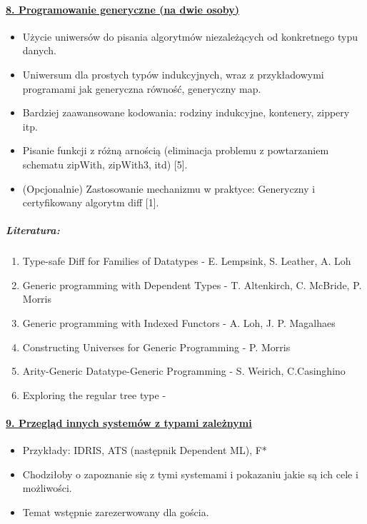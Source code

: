 \documentclass[10pt, a4paper]{article}
\begin{document}
\paragraph{\underline{8. Programowanie generyczne (na dwie osoby)}}


\begin{itemize}
\addtolength{\itemsep}{-0.5\baselineskip}

\item Użycie uniwersów do pisania algorytmów niezależących od konkretnego typu danych.
\item Uniwersum dla prostych typów indukcyjnych, wraz z przykładowymi programami jak generyczna równość, generyczny map.
\item Bardziej zaawansowane kodowania: rodziny indukcyjne, kontenery, zippery itp.
\item Pisanie funkcji z różną arnością (eliminacja problemu z powtarzaniem schematu zipWith, zipWith3, itd) [5].
\item (Opcjonalnie) Zastosowanie mechanizmu w praktyce: Generyczny i certyfikowany algorytm diff [1].

\end{itemize}

\subparagraph{Literatura:}


\begin{enumerate}
\addtolength{\itemsep}{-0.5\baselineskip}

\item  Type-safe Diff for Families of Datatypes - E. Lempsink, S. Leather, A. Loh
\item  Generic programming with Dependent Types - T. Altenkirch, C. McBride, P. Morris
\item  Generic programming with Indexed Functors - A. Loh, J. P. Magalhaes
\item  Constructing Universes for Generic Programming - P. Morris
\item  Arity-Generic Datatype-Generic Programming - S. Weirich, C.Casinghino
\item  Exploring the regular tree type -

\end{enumerate}

\paragraph{\underline{9. Przegląd innych systemów z typami zależnymi}}

\begin{itemize}
\addtolength{\itemsep}{-0.5\baselineskip}
 \item Przykłady: IDRIS, ATS (następnik Dependent ML), F*
 \item Chodziłoby o zapoznanie się z tymi systemami i pokazaniu jakie są ich cele i możliwości.
 \item Temat wstępnie zarezerwowany dla gościa.
\end{itemize}
\end{document}

